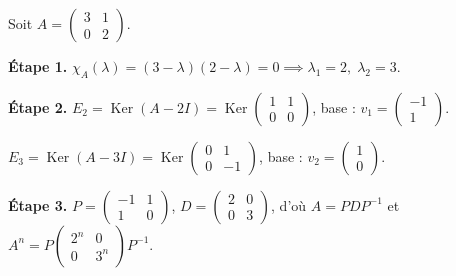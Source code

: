 \documentclass[11pt,a4paper,twoside]{book}
\DeclareMathOperator{\Ker}{Ker}
\begin{document}
\begin{exemplebox}
Soit $A = \begin{pmatrix} 3 & 1 \\ 0 & 2 \end{pmatrix}$.

\textbf{Étape 1.} $\chi_A(\lambda) = (3-\lambda)(2-\lambda) = 0 \implies \lambda_1 = 2,\; \lambda_2 = 3$.

\textbf{Étape 2.} $E_2 = \Ker(A - 2I) = \Ker\begin{pmatrix}1&1\\0&0\end{pmatrix}$, base : $v_1 = \begin{pmatrix}-1\\1\end{pmatrix}$.

$E_3 = \Ker(A - 3I) = \Ker\begin{pmatrix}0&1\\0&-1\end{pmatrix}$, base : $v_2 = \begin{pmatrix}1\\0\end{pmatrix}$.

\textbf{Étape 3.} $P = \begin{pmatrix}-1&1\\1&0\end{pmatrix}$, $D = \begin{pmatrix}2&0\\0&3\end{pmatrix}$, d'où $A = PDP^{-1}$
et $A^n = P\begin{pmatrix}2^n&0\\0&3^n\end{pmatrix}P^{-1}$.
\end{exemplebox}
\end{document}
